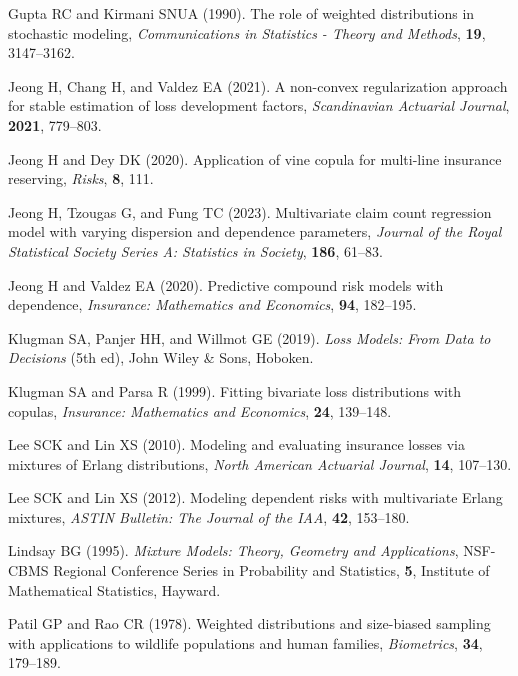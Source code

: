\documentclass[eng]{csam}
\begin{document}
\begin{reference}
Gupta RC and Kirmani SNUA (1990). The role of weighted distributions in stochastic modeling, {\em Communications in Statistics - Theory and Methods}, {\bf 19}, 3147--3162.

Jeong H, Chang H, and Valdez EA (2021). A non-convex regularization approach for stable estimation of loss development factors, {\em Scandinavian Actuarial Journal}, {\bf 2021}, 779--803.

Jeong H and Dey DK (2020). Application of vine copula for multi-line insurance reserving, {\em Risks}, {\bf 8}, 111.

Jeong H, Tzougas G, and Fung TC (2023). Multivariate claim count regression model with varying dispersion and dependence parameters, {\em Journal of the Royal Statistical Society Series A: Statistics in Society}, {\bf 186}, 61--83.

Jeong H and Valdez EA (2020). Predictive compound risk models with dependence, {\em Insurance: Mathematics and Economics}, {\bf 94}, 182--195.

Klugman SA, Panjer HH, and Willmot GE (2019). {\em Loss Models: From Data to Decisions} (5th ed), John Wiley \& Sons, Hoboken.

Klugman SA and Parsa R (1999). Fitting bivariate loss distributions with copulas, {\em Insurance: Mathematics and Economics}, {\bf 24}, 139--148.

Lee SCK and Lin XS (2010). Modeling and evaluating insurance losses via mixtures of Erlang distributions, {\em North American Actuarial Journal}, {\bf 14}, 107--130.

Lee SCK and Lin XS (2012). Modeling dependent risks with multivariate Erlang mixtures, {\em ASTIN Bulletin: The Journal of the IAA}, {\bf 42}, 153--180.

Lindsay BG (1995). {\em Mixture Models: Theory, Geometry and Applications}, NSF-CBMS Regional Conference Series in Probability and Statistics, {\bf 5}, Institute of Mathematical Statistics, Hayward.

Patil GP and Rao CR (1978). Weighted distributions and size-biased sampling with applications to wildlife populations and human families, {\em Biometrics}, {\bf 34}, 179--189.


\end{reference}
\end{document}
